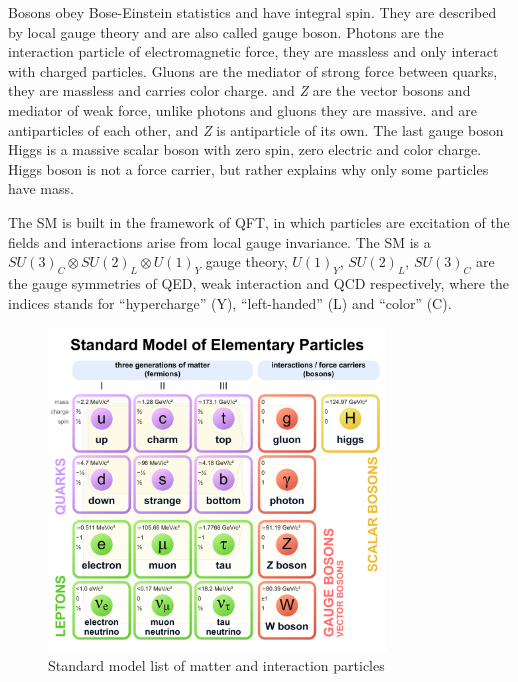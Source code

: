 Bosons obey Bose-Einstein statistics and have integral spin.
They are described by local gauge theory and are also called gauge boson.
Photons are the interaction particle of electromagnetic force, they are massless
and only interact with charged particles. Gluons are the mediator of strong force
between quarks, they are massless and carries color charge. \Wplusminus{} and \textit{Z}
are the vector bosons and mediator of weak force,
unlike photons and gluons they are massive. \Wplus{} and \Wminus{}
are antiparticles of each other, and \textit{Z} is antiparticle of its own.
The last gauge boson Higgs is a massive scalar boson with zero spin,
zero electric and color charge. Higgs boson is not a force carrier,
but rather explains why only some particles have mass.

The \gls{SM} is built in the framework of \gls{QFT}, in which particles
are excitation of the fields and interactions arise from local gauge
invariance. The \gls{SM} is a \( {SU(3)}_C \otimes {SU(2)}_L \otimes {U(1)}_Y\)
gauge theory, \( {U(1)}_Y \), \( {SU(2)}_L \), \( {SU(3)}_C \) are the gauge symmetries
of \gls{QED}, weak interaction and \gls{QCD} respectively, where the indices
stands for ``hypercharge'' (Y), ``left-handed'' (L) and ``color'' (C).

\begin{figure}[!ht]
  \centering
  \includegraphics[width=0.8\textwidth]{figures/Standard_Model_of_Elementary_Particles.pdf}
  \caption[Standard model list of matter and interaction particles]%
  {Standard model list of matter and interaction particles~\cite{image-standard-model}}%
  \label{fig:standard-model-details}
\end{figure}

